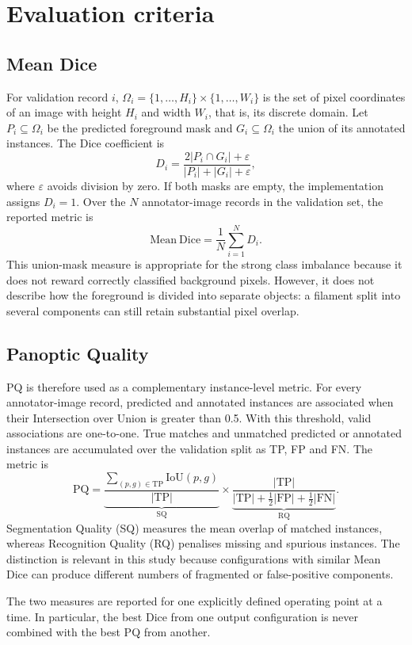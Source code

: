 \section{Evaluation criteria}
\label{sec:background}

\subsection{Mean Dice}

For validation record $i$, $\Omega_i=\{1,\ldots,H_i\}\times
\{1,\ldots,W_i\}$ is the set of pixel coordinates of an image with height $H_i$ and
width $W_i$, that is, its discrete domain. Let $P_i\subseteq\Omega_i$ be the predicted
foreground mask and $G_i\subseteq\Omega_i$ the union of its annotated instances. The
Dice coefficient is
\begin{equation}
D_i=\frac{2|P_i\cap G_i|+\varepsilon}
{|P_i|+|G_i|+\varepsilon},
\end{equation}
where $\varepsilon$ avoids division by zero. If both masks are empty, the implementation
assigns $D_i=1$. Over the $N$ annotator-image records in the validation set, the reported
metric is
\begin{equation}
\mathrm{Mean\ Dice}=\frac{1}{N}\sum_{i=1}^{N}D_i.
\end{equation}
This union-mask measure is appropriate for the strong class imbalance because it does
not reward correctly classified background pixels. However, it does not describe how
the foreground is divided into separate objects: a filament split into several
components can still retain substantial pixel overlap.

\subsection{Panoptic Quality}

PQ is therefore used as a complementary instance-level metric. For every
annotator-image record, predicted and annotated instances are associated when their
Intersection over Union is greater than 0.5. With this threshold, valid associations are
one-to-one. True matches and unmatched predicted or annotated instances are accumulated
over the validation split as TP, FP and FN. The metric is
\begin{equation}
\mathrm{PQ}=
\underbrace{\frac{\sum_{(p,g)\in\mathrm{TP}}\mathrm{IoU}(p,g)}{|\mathrm{TP}|}}_{\mathrm{SQ}}
\times
\underbrace{\frac{|\mathrm{TP}|}{|\mathrm{TP}|+\tfrac12|\mathrm{FP}|+\tfrac12|\mathrm{FN}|}}_{\mathrm{RQ}}.
\end{equation}
Segmentation Quality (SQ) measures the mean overlap of matched instances, whereas
Recognition Quality (RQ) penalises missing and spurious instances. The distinction is
relevant in this study because configurations with similar Mean Dice can produce
different numbers of fragmented or false-positive components.

The two measures are reported for one explicitly defined operating point at a time. In
particular, the best Dice from one output configuration is never combined with the best
PQ from another.
